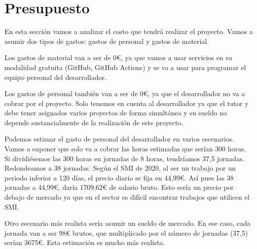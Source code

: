 \documentclass[openright,twoside,12pt]{book}
\begin{document}
\section{Presupuesto}

En esta sección vamos a analizar el costo que tendrá realizar el proyecto. Vamos a asumir dos tipos de gastos: gastos de personal y gastos de material.

Los gastos de material van a ser de 0€, ya que vamos a usar servicios en su modalidad gratuita (GitHub, GitHub Actions) y se va a usar para programar el equipo personal del desarrollador.

Los gastos de personal también van a ser de 0€, ya que el desarrollador no va a cobrar por el proyecto. Solo tenemos en cuenta al desarrollador ya que el tutor y debe tener asignados varios proyectos de forma simultánea y su sueldo no depende sustancialmente de la realización de este proyecto. 

Podemos estimar el gasto de personal del desarrollador en varios escenarios. Vamos a suponer que solo va a cobrar las horas estimadas que serían 300 horas. Si dividiésemos las 300 horas en jornadas de 8 horas, tendríamos 37,5 jornadas. Redondeamos a 38 jornadas. Según el SMI de 2020, al ser un trabajo por un periodo inferior a 120 días, el precio diario se fija en 44,99€. Así pues las 38 jornadas a 44,99€, daría 1709,62€ de salario bruto.\cite{smi} Esto sería un precio por debajo de mercado ya que en el sector es difícil encontrar trabajos que utilicen el SMI.

Otro escenario más realista sería asumir un sueldo de mercado. En ese caso, cada jornada van a ser 98€ brutos, que multiplicado por el número de jornadas (37,5) serían 3675€. Esta estimación es mucho más realista.


\end{document}
